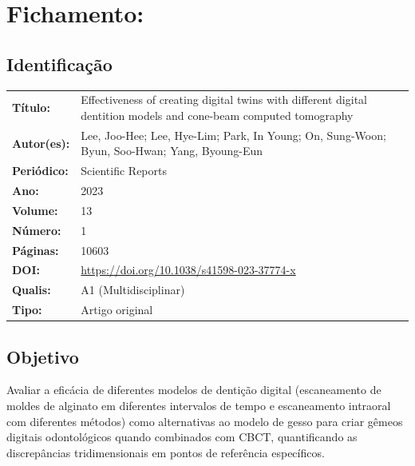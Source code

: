 \section{Fichamento: }

\subsection{Identificação}
\begin{tabular}{ll}
\textbf{Título:} & Effectiveness of creating digital twins with different
digital dentition models and cone-beam computed tomography \\
\textbf{Autor(es):} & Lee, Joo-Hee; Lee, Hye-Lim; Park, In Young; On, Sung-Woon;
Byun, Soo-Hwan; Yang, Byoung-Eun \\
\textbf{Periódico:} & Scientific Reports \\
\textbf{Ano:} & 2023 \\
\textbf{Volume:} & 13 \\
\textbf{Número:} & 1 \\
\textbf{Páginas:} & 10603 \\
\textbf{DOI:} & \url{https://doi.org/10.1038/s41598-023-37774-x} \\
\textbf{Qualis:} & A1 (Multidisciplinar) \\
\textbf{Tipo:} & Artigo original \\
\end{tabular}

\subsection{Objetivo}
Avaliar a eficácia de diferentes modelos de dentição digital (escaneamento de
moldes de alginato em diferentes intervalos de tempo e escaneamento intraoral
com diferentes métodos) como alternativas ao modelo de gesso para criar gêmeos
digitais odontológicos quando combinados com CBCT, quantificando as discrepâncias
tridimensionais em pontos de referência específicos.

